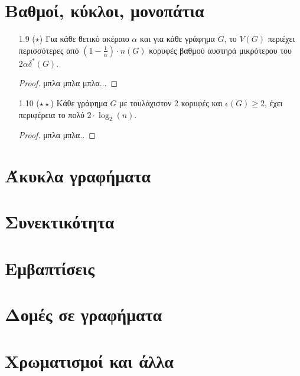\documentclass[a4paper, oneside, 11pt]{article}
\begin{document}


\section{Βαθμοί, κύκλοι, μονοπάτια}

\begin{enumerate}
\item[1.9 ($\star$)]
   Για κάθε θετικό ακέραιο $\alpha$ και για κάθε γράφημα $G$, το $V(G)$
   περιέχει περισσότερες από $\left( 1-\frac1\alpha \right) \cdot n(G)$
   κορυφές βαθμού αυστηρά μικρότερου του $2\alpha\delta^*(G)$.

   \begin{proof}
      μπλα μπλα μπλα...
   \end{proof}

\item[1.10 ($\star\star$)]
   Κάθε γράφημα $G$ με τουλάχιστον 2 κορυφές και
   $\epsilon(G) \geq 2$, έχει περιφέρεια το πολύ $2 \cdot \log_2 (n)$.

   \begin{proof}
      μπλα μπλα..
   \end{proof}
\end{enumerate}

\section{Άκυκλα γραφήματα}
\section{Συνεκτικότητα}
\section{Εμβαπτίσεις}
\section{Δομές σε γραφήματα}
\section{Χρωματισμοί και άλλα}
\end{document}
